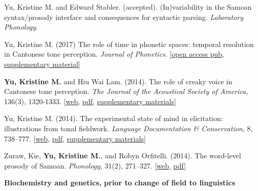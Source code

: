 \documentclass[10pt]{article}
\newcommand{\blankline}{\quad\pagebreak[3]}
\newcommand{\halfblankline}{\quad\vspace{-0.5\baselineskip}\pagebreak[3]}
\begin{document}
\begin{bibenum}
      \item Yu, Kristine M. and Edward Stabler. (accepted).
        (In)variability in the Samoan syntax/prosody interface and consequences for
        syntactic parsing. \emph{Laboratory Phonology}.
    \item Yu, Kristine M. (2017) The role of time in phonetic
      spaces: temporal resolution in Cantonese tone
      perception. \emph{Journal of Phonetics}. [\href{https://doi.org/10.1016/j.wocn.2017.06.004}{open access pub}, \href{https://github.com/krismyu/resolution}{supplementary material}]
    \item \textbf{Yu, Kristine M.} and Hiu Wai Lam. (2014). The role of
      creaky voice in Cantonese tone perception. \emph{The Journal of
        the Acoustical Society of America}, 136(3), 1320-1333.
      [\href{http://scitation.aip.org/content/asa/journal/jasa/136/3/10.1121/1.4887462}{web},
      \href{http://www.krisyu.org/pages/pdfs/yulam2014-jasa-cantcr.pdf}{pdf},
      \href{http://www.krisyu.org/blog/supp-material-cantonese-creak-perception.html}{supplementary materials}]

    \item Yu, Kristine M. (2014). The experimental state of mind in
      elicitation: illustrations from tonal fieldwork. \emph{Language Documentation \&
        Conservation}, 8, 738--777. 
      [\href{http://scholarspace.manoa.hawaii.edu/bitstream/handle/10125/24623/Yu.pdf?sequence=1}{web},
      \href{http://www.krisyu.org/pages/pdfs/yu2014-kiy.pdf}{pdf}, 
      \href{http://www.krisyu.org/blog/ldc-kiy-overview.html}{supplementary materials}]

    \item Zuraw, Kie, \textbf{Yu, Kristine M.}, and Robyn Orfitelli. (2014). The word-level prosody of
      {S}amoan. \emph{Phonology}, 31(2), 271--327.
      [\href{http://dx.doi.org/10.1017/S095267571400013X}{web},
      \href{http://www.krisyu.org/pages/pdfs/zurawyuorfitelli2014.pdf}{pdf}]

\end{bibenum}

\blankline

\blankline

\textbf{Biochemistry and genetics, prior to change of field to linguistics} \hfill 

\halfblankline
\end{document}
